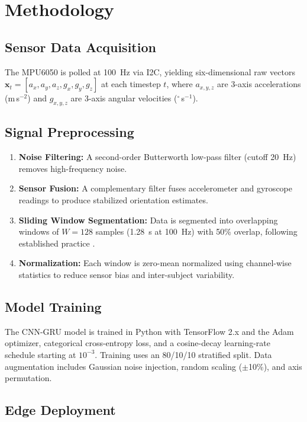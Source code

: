 \documentclass[conference]{IEEEtran}
\begin{document}
\section{Methodology}

\subsection{Sensor Data Acquisition}

The MPU6050 is polled at 100~Hz via I2C, yielding six-dimensional raw vectors $\mathbf{x}_t = [a_x, a_y, a_z, g_x, g_y, g_z]$ at each timestep $t$, where $a_{x,y,z}$ are 3-axis accelerations (m\,s$^{-2}$) and $g_{x,y,z}$ are 3-axis angular velocities ($^\circ$\,s$^{-1}$).

\subsection{Signal Preprocessing}

\begin{enumerate}
    \item \textbf{Noise Filtering:} A second-order Butterworth low-pass filter (cutoff 20~Hz) removes high-frequency noise.
    \item \textbf{Sensor Fusion:} A complementary filter fuses accelerometer and gyroscope readings to produce stabilized orientation estimates.
    \item \textbf{Sliding Window Segmentation:} Data is segmented into overlapping windows of $W = 128$ samples (1.28~s at 100~Hz) with 50\% overlap, following established practice \cite{b3}.
    \item \textbf{Normalization:} Each window is zero-mean normalized using channel-wise statistics to reduce sensor bias and inter-subject variability.
\end{enumerate}

\subsection{Model Training}

The CNN-GRU model is trained in Python with TensorFlow 2.x and the Adam optimizer, categorical cross-entropy loss, and a cosine-decay learning-rate schedule starting at $10^{-3}$. Training uses an 80/10/10 stratified split. Data augmentation includes Gaussian noise injection, random scaling ($\pm$10\%), and axis permutation.

\subsection{Edge Deployment}
\end{document}
